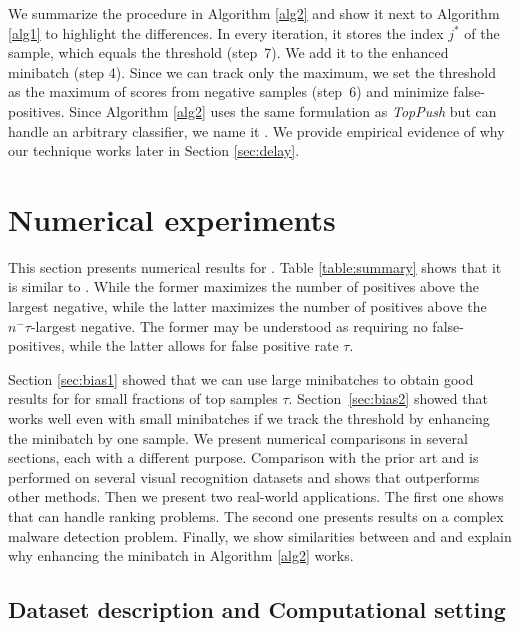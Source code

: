We summarize the procedure in Algorithm \ref{alg2} and show it next to Algorithm \ref{alg1} to highlight the differences. In every iteration, it stores the index $j^*$ of the sample, which equals the threshold (step~7). We add it to the enhanced minibatch (step 4). Since we can track only the maximum, we set the threshold as the maximum of scores from negative samples (step~6) and minimize false-positives. Since Algorithm \ref{alg2} uses the same formulation as \textit{TopPush} \cite{li2014top} but can handle an arbitrary classifier, we name it \DeepTopPush. We provide empirical evidence of why our technique works later in Section \ref{sec:delay}.

\section{Numerical experiments}\label{sec:numerics}

This section presents numerical results for \DeepTopPush. Table \ref{table:summary} shows that it is similar to \PatMatNP. While the former maximizes the number of positives above the largest negative, while the latter maximizes the number of positives above the $n^-\tau$-largest negative. The former may be understood as requiring no false-positives, while the latter allows for false positive rate $\tau$.

Section \ref{sec:bias1} showed that we can use large minibatches to obtain good results for \PatMatNP for small fractions of top samples $\tau$. Section~\ref{sec:bias2} showed that \DeepTopPush works well even with small minibatches if we track the threshold by enhancing the minibatch by one sample. We present numerical comparisons in several sections, each with a different purpose. Comparison with the prior art \TFCO and \APPerf is performed on several visual recognition datasets and shows that \DeepTopPush outperforms other methods. Then we present two real-world applications. The first one shows that \DeepTopPush can handle ranking problems. The second one presents results on a complex malware detection problem. Finally, we show similarities between \DeepTopPush and \PatMatNP and explain why enhancing the minibatch in Algorithm \ref{alg2} works.

\subsection{Dataset description and Computational setting}\label{sec:set}

